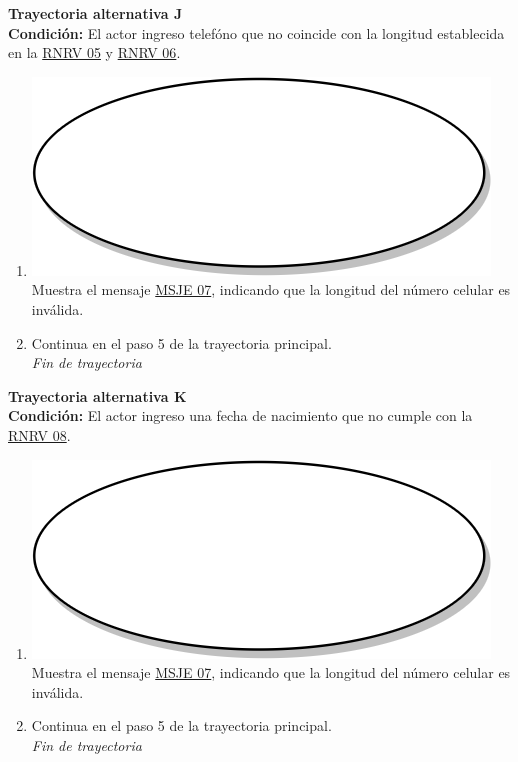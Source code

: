 \textbf{Trayectoria alternativa J} \label{cu2_ta_j}\\
\textbf{Condición:} El actor ingreso telefóno que no coincide con la longitud establecida en la \hyperref[rnrv_05]{RNRV 05} y \hyperref[rnrv_06]{RNRV 06}.\\
 \begin{enumerate}[label=J\arabic*]
    \item {\includegraphics[scale=.05]{Capitulo3/img/proceso.png} Muestra el mensaje \hyperref[msje_07]{MSJE 07}, indicando que la longitud del número celular es inválida.}
    \item {Continua en el paso 5 de la trayectoria principal.} \\
    \textit{Fin de trayectoria} \\
\end{enumerate}

\textbf{Trayectoria alternativa K} \label{cu2_ta_k}\\
\textbf{Condición:} El actor ingreso una fecha de nacimiento que no cumple con la \hyperref[rnrv_04]{RNRV 08}.\\
 \begin{enumerate}[label=K\arabic*]
    \item {\includegraphics[scale=.05]{Capitulo3/img/proceso.png} Muestra el mensaje \hyperref[msje_07]{MSJE 07}, indicando que la longitud del número celular es inválida.}
    \item {Continua en el paso 5 de la trayectoria principal.} \\
    \textit{Fin de trayectoria} \\
\end{enumerate}

